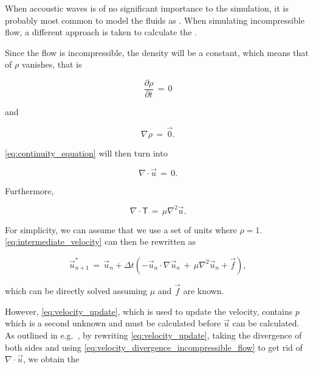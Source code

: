When accoustic waves is of no significant importance to the simulation, it is probably most common to model the fluids as \incompressible. When simulating incompressible flow, a different approach is taken to calculate the .

Since the flow is incompressible, the density will be a constant, which means that \derivatives of $\rho$ vanishes, that is

\begin{equation} \label{eq:density_partial_time_derivative_incompressible_flow}
\frac{\partial \rho}{\partial t} \,=\, 0
\end{equation}

and

\begin{equation} \label{eq:density_divergence_incompressible_flow}
\nabla\rho \,=\, \vec{0}.
\end{equation}

\eqref{eq:continuity_equation} will then turn into

\begin{equation} \label{eq:velocity_divergence_incompressible_flow}
\nabla\cdot\vec{u} \,=\, 0.
\end{equation}

Furthermore, %

\begin{equation} \label{eq:deviatoric_stress_tensor_incompressible_flow}
\nabla\cdot\boldsymbol{\mathsf{T}} \,=\, \mu\nabla^2\vec{u}.
\end{equation}

For simplicity, we can assume that we use a set of units where $\rho = 1$. \eqref{eq:intermediate_velocity} can then be rewritten as

\begin{equation} \label{eq:intermediate_velocity_reduced}
\vec{u}^*_{n+1} \,= \, \vec{u}_{n} + \Delta t(- \vec{u}_{n}\cdot\nabla\vec{u}_{n} \,+\, \mu\nabla^2\vec{u}_{n} + \vec{f}),
\end{equation}

which can be directly solved assuming $\mu$ and $\vec{f}$ are known.


However, \eqref{eq:velocity_update}, which is used to update the velocity, contains $p$ which is a second unknown and must be calculated before $\vec{u}$ can be calculated. As outlined in e.g.\ \citep{Losasso2004}, by rewriting \eqref{eq:velocity_update}, taking the divergence of both sides and using \eqref{eq:velocity_divergence_incompressible_flow} to get rid of $\nabla\cdot\vec{u}$, we obtain the 

